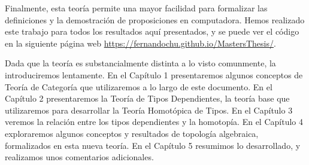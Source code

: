 \documentclass[../main.tex]{subfiles}
\begin{document}
Finalmente, esta teor\'ia permite una mayor facilidad para formalizar las definiciones y la demostraci\'on de proposiciones en computadora.
Hemos realizado este trabajo para todos los resultados aqu\'i presentados, y se puede ver el c\'odigo en la siguiente p\'agina web \url{https://fernandochu.github.io/MastersThesis/}.

Dada que la teor\'ia es substancialmente distinta a lo visto comunmente, la introduciremos lentamente.
En el Cap\'itulo 1 presentaremos algunos conceptos de Teor\'ia de Categor\'ia que utilizaremos a lo largo de este documento. En el Cap\'itulo 2 presentaremos la Teor\'ia de Tipos Dependientes, la teor\'ia base que utilizaremos para desarrollar la Teor\'ia Homot\'opica de Tipos. En el Cap\'itulo 3 veremos la relación entre los tipos dependientes y la homotop\'ia. En el Cap\'itulo 4 exploraremos algunos conceptos y resultados de topolog\'ia algebraica, formalizados en esta nueva teor\'ia.
En el Cap\'itulo 5 resumimos lo desarrollado, y realizamos unos comentarios adicionales.
\end{document}
